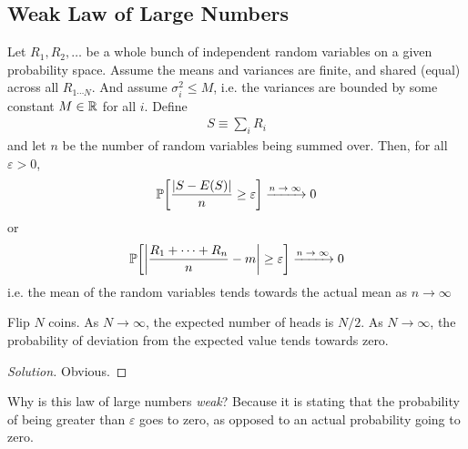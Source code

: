 \subsection{Weak Law of Large Numbers}
\begin{theorem}
    Let $R_1, R_2, \ldots$ be a whole bunch of independent random variables on a given probability space. Assume the means and variances are finite, and shared (equal) across all $R_{1 \cdots N}$. And assume $\sigma_i^2 \le M$, i.e. the variances are bounded by some constant $M \in \mathbb{R}$ for all $i$. Define
    \begin{align}
        S \equiv \sum_{i} R_i
    \end{align}
    and let $n$ be the number of random variables being summed over. Then, for all $\varepsilon > 0$,
    \begin{align}
        \probability\qty[\frac{\abs{S - E(S)}}{n} \ge \varepsilon] \ce{->[$n \to \infty$]} 0
    \end{align}
    or
    \begin{align}
        \probability\qty[ \abs{\frac{R_1 + \cdots + R_n}{n} - m} \ge \varepsilon ] \ce{->[$n \to \infty$]} 0
    \end{align}
    i.e. the mean of the random variables tends towards the actual mean as $n \to \infty$
\end{theorem}
\begin{example}
    Flip $N$ coins. As $N \to \infty$, the expected number of heads is $N/2$. As $N \to \infty$, the probability of deviation from the expected value tends towards zero.
\end{example}
\begin{proof}[Solution]
    Obvious.
\end{proof}
Why is this law of large numbers \textit{weak}? Because it is stating that the probability of being greater than $\varepsilon$ goes to zero, as opposed to an actual probability going to zero.

